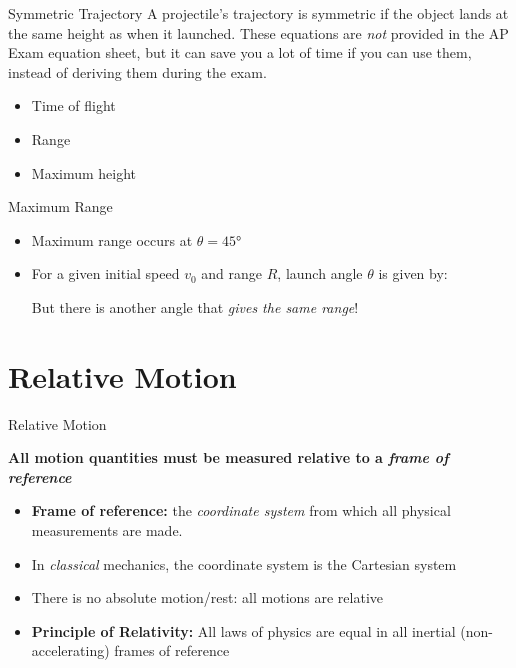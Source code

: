 \documentclass[12pt,compress,aspectratio=169,dvipsnames]{beamer}
\begin{document}
\begin{frame}{Symmetric Trajectory}
  A projectile's trajectory is symmetric if the object lands at the same height
  as when it launched. These equations are \emph{not} provided in the AP Exam
  equation sheet, but it can save you a lot of time if you can use them, instead
  of deriving them during the exam.
  \begin{itemize}
  \item Time of flight
  \item Range
  \item Maximum height
  \end{itemize}
\end{frame}



\begin{frame}{Maximum Range}
  
  \begin{itemize}
  \item Maximum range occurs at $\theta=\ang{45}$
  \item For a given initial speed $v_0$ and range $R$, launch angle $\theta$ is
    given by:
    

    But there is another angle that \emph{gives the same range}!

  \end{itemize}
\end{frame}



\section{Relative Motion}

\begin{frame}{Relative Motion}
  
  \begin{block}{}
    \textbf{All motion quantities must be measured relative to a
      \emph{frame of reference}}
  \end{block}

  \vspace{.2in}
  \begin{itemize}
  \item\textbf{Frame of reference:} the \emph{coordinate system} from which all
    physical measurements are made.
  \item In \emph{classical} mechanics, the coordinate system is the
    Cartesian system
  \item There is no absolute motion/rest: all motions are relative
  \item\textbf{Principle of Relativity:} All laws of physics are equal in all
    inertial (non-accelerating) frames of reference
  \end{itemize}
\end{frame}  
\end{document}
